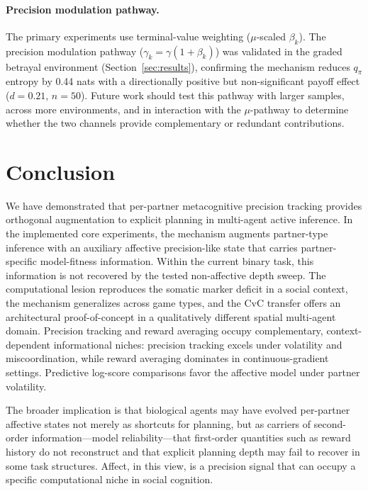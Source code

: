 \documentclass[11pt,a4paper]{article}
\begin{document}
\paragraph{Precision modulation pathway.}
The primary experiments use terminal-value weighting ($\mu$-scaled $\beta_k$). The precision modulation pathway ($\gamma_k = \gamma(1 + \beta_k)$) was validated in the graded betrayal environment (Section~\ref{sec:results}), confirming the mechanism reduces $q_\pi$ entropy by 0.44 nats with a directionally positive but non-significant payoff effect ($d = 0.21$, $n = 50$). Future work should test this pathway with larger samples, across more environments, and in interaction with the $\mu$-pathway to determine whether the two channels provide complementary or redundant contributions.

\section{Conclusion}
\label{sec:conclusion}

We have demonstrated that per-partner metacognitive precision tracking provides orthogonal augmentation to explicit planning in multi-agent active inference. In the implemented core experiments, the mechanism augments partner-type inference with an auxiliary affective precision-like state that carries partner-specific model-fitness information. Within the current binary task, this information is not recovered by the tested non-affective depth sweep. The computational lesion reproduces the somatic marker deficit in a social context, the mechanism generalizes across game types, and the CvC transfer offers an architectural proof-of-concept in a qualitatively different spatial multi-agent domain. Precision tracking and reward averaging occupy complementary, context-dependent informational niches: precision tracking excels under volatility and miscoordination, while reward averaging dominates in continuous-gradient settings. Predictive log-score comparisons favor the affective model under partner volatility.

The broader implication is that biological agents may have evolved per-partner affective states not merely as shortcuts for planning, but as carriers of second-order information---model reliability---that first-order quantities such as reward history do not reconstruct and that explicit planning depth may fail to recover in some task structures. Affect, in this view, is a precision signal that can occupy a specific computational niche in social cognition.
\end{document}
